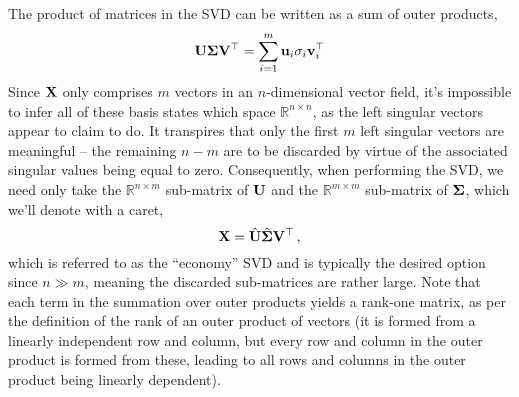 The product of matrices in the SVD can be written as a sum of outer
products,
%
\begin{displaymath}
  \mathbf{U}\mathbf{\Sigma}\mathbf{V}^\top
  = \sum_{i=1}^m \mathbf{u}_i\sigma_i\mathbf{v}_i^\top
\end{displaymath}
%
Since $\mathbf{X}$ only comprises $m$ vectors in an $n$-dimensional vector field,
it's impossible to infer all of these basis states which space $\mathbb{R}^{n\times n}$,
as the left singular vectors appear to claim to do. It transpires that only
the first $m$ left singular vectors are meaningful -- the remaining $n-m$
are to be discarded by virtue of the associated singular values being equal to zero.
Consequently, when performing the SVD, we need only take the $\mathbb{R}^{n\times m}$
sub-matrix of $\mathbf{U}$ and the $\mathbb{R}^{m\times m}$ sub-matrix of $\mathbf{\Sigma}$,
which we'll denote with a caret,
%
\begin{displaymath}
  \mathbf{X} = \hat{\mathbf{U}}\hat{\mathbf{\Sigma}}\mathbf{V}^\top \,,
\end{displaymath}
%
which is referred to as the ``economy'' SVD and is typically the desired
option since $n\gg m$, meaning the discarded sub-matrices are rather large.
Note that each term in the summation over outer products yields a rank-one
matrix, as per the definition of the rank of an outer product of vectors
(it is formed from a linearly independent row and column, but every row
and column in the outer product is formed from these, leading to all
rows and columns in the outer product being linearly dependent).\\

